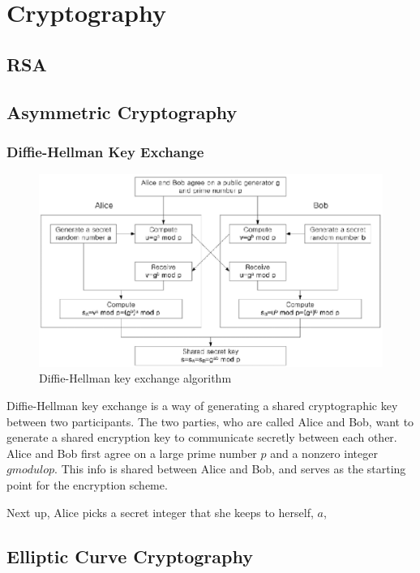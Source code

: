 \chapter{Cryptography}
\label{Cryptography}

\section{RSA}

\section{Asymmetric Cryptography}
\subsection{Diffie-Hellman Key Exchange}

\begin{figure}
	\includegraphics[width=\textwidth]{pictures/diffiehellman.eps}
	\caption{Diffie-Hellman key exchange algorithm\cite{Jeon2014-ag}}
	\label{Diagram, Diffie-Hellman Key Exchange}
\end{figure}
						
Diffie-Hellman key exchange is a way of generating a shared cryptographic key between two participants. The two parties, who are called Alice and Bob, want to generate a shared encryption key to communicate secretly between each other. Alice and Bob first agree on a large prime number \(p\) and a nonzero integer \(g modulo p\). This info is shared between Alice and Bob, and serves as the starting point for the encryption scheme.
						
Next up, Alice picks a secret integer that she keeps to herself, \(a\), 
						
\section{Elliptic Curve Cryptography}
						

